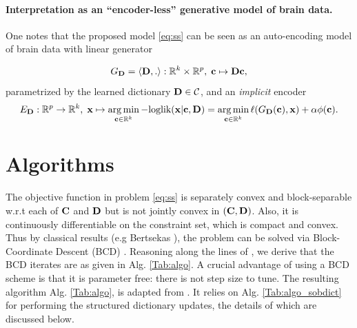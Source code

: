 \paragraph{Interpretation as an ``encoder-less'' generative model of brain data.}
One notes that the proposed model \ref{eq:ss} can be seen as an auto-encoding model of brain data with linear generator

\begin{equation}
  G_{\mathbf{D}} = \langle \mathbf{D}, .\rangle: \mathbb R^k \times \mathbb R^p,\; \mathbf{c} \mapsto \mathbf{Dc},
\end{equation}
parametrized by the learned dictionary $\mathbf{D} \in \mathcal C$, and an \textit{implicit} encoder
\begin{equation}
  E_{\mathbf{D}}: \mathbb R^p \rightarrow \mathbb R^k,\; \mathbf{x} \mapsto \operatorname*{arg\,min}_{\mathbf{c} \in \mathbb R^k} -\text{loglik}(\mathbf{x}|\mathbf{c},\mathbf{D}) = \operatorname*{arg\,min}_{\mathbf{c} \in \mathbb R^k}\ell(G_{\mathbf{D}}(\mathbf{c}),\mathbf{x}) + \alpha\phi(\mathbf{c}).
  \end{equation}


\section{Algorithms}
The objective function in problem
\eqref{eq:ss} is separately convex and block-separable
w.r.t each of $\mathbf{C}$ and $\mathbf{D}$ but is not jointly convex in $(\mathbf{C},\mathbf{D})$. Also,
it is continuously differentiable on the constraint set, which is
compact and convex. Thus by classical results (e.g Bertsekas   \citep{bertsekas1999nonlinear}), the problem can be solved via
Block-Coordinate Descent
(BCD)   \citep{mairal2010}.
 Reasoning along the lines of   \citep{jenatton2010structured}, we derive
 that the BCD iterates are as given in Alg. \ref{Tab:algo}.
A crucial advantage of using a BCD scheme is that it is parameter
free: there is not step size to tune.
The resulting algorithm Alg. \ref{Tab:algo}, is adapted from   \citep{mairal2010}.
It relies on Alg. \ref{Tab:algo_sobdict} for performing the structured dictionary updates, the details of which are discussed below.

